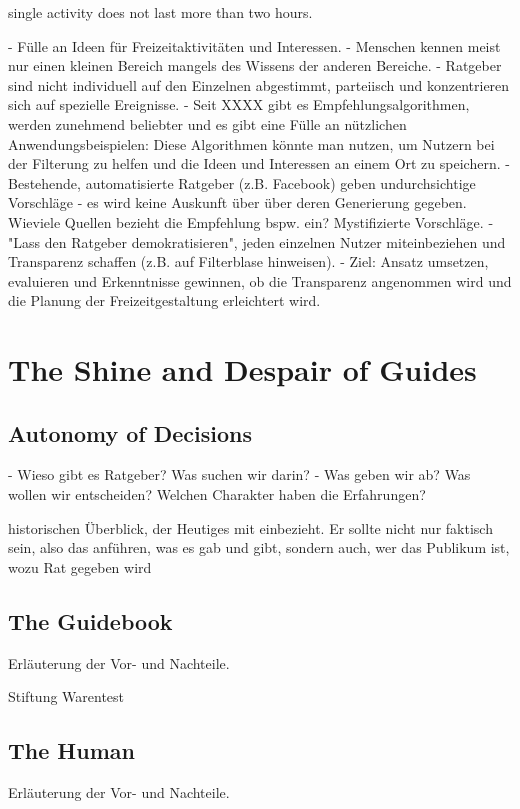 \documentclass[12pt,numbers=noenddot,parskip,bibliography=totocnumbered,listof=totocnumbered]{scrreprt}
\begin{document}
single activity does not last  more than two hours. 

\newpage

- Fülle an Ideen für Freizeitaktivitäten und Interessen.
- Menschen kennen meist nur einen kleinen Bereich mangels des Wissens der anderen Bereiche.
- Ratgeber sind nicht individuell auf den Einzelnen abgestimmt, parteiisch und konzentrieren sich auf spezielle Ereignisse.
- Seit XXXX gibt es Empfehlungsalgorithmen, werden zunehmend beliebter und es gibt eine Fülle an nützlichen Anwendungsbeispielen: Diese Algorithmen könnte man nutzen, um Nutzern bei der Filterung zu helfen und die Ideen und Interessen an einem Ort zu speichern.
- Bestehende, automatisierte Ratgeber (z.B. Facebook) geben undurchsichtige Vorschläge - es wird keine Auskunft über über deren Generierung gegeben. 
Wieviele Quellen bezieht die Empfehlung bspw. ein? Mystifizierte Vorschläge.
- "Lass den Ratgeber demokratisieren", jeden einzelnen Nutzer miteinbeziehen und Transparenz schaffen (z.B. auf Filterblase hinweisen).
- Ziel: Ansatz umsetzen, evaluieren und Erkenntnisse gewinnen, ob die Transparenz angenommen wird und die Planung der Freizeitgestaltung erleichtert wird.

\chapter{The Shine and Despair of Guides}

\section{Autonomy of Decisions}
- Wieso gibt es Ratgeber? Was suchen wir darin?
- Was geben wir ab? Was wollen wir entscheiden? Welchen Charakter haben die Erfahrungen?

historischen Überblick, der Heutiges mit einbezieht. Er sollte nicht nur faktisch sein, also das anführen, was es gab und gibt, sondern auch, wer das Publikum ist, wozu Rat gegeben wird
\section{The Guidebook}
Erläuterung der Vor- und Nachteile.

Stiftung Warentest

\section{The Human}
Erläuterung der Vor- und Nachteile.
\end{document}
